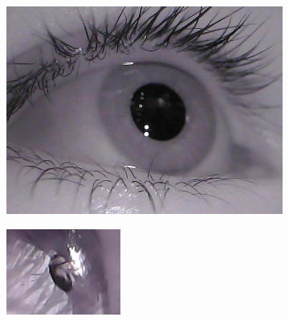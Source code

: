 \begin{figure}[ht]
    \centering
    \begin{subfigure}{.30\textwidth}
      \centering
      \includegraphics[width=.9\linewidth]{plots/eye_dataset/eye1.png}

      \label{fig:ds1}
    \end{subfigure}%
    \begin{subfigure}{.30\textwidth}
      \centering
      \includegraphics[width=.9\linewidth]{plots/eye_dataset/eye2.png}


\end{subfigure}
\end{figure}
